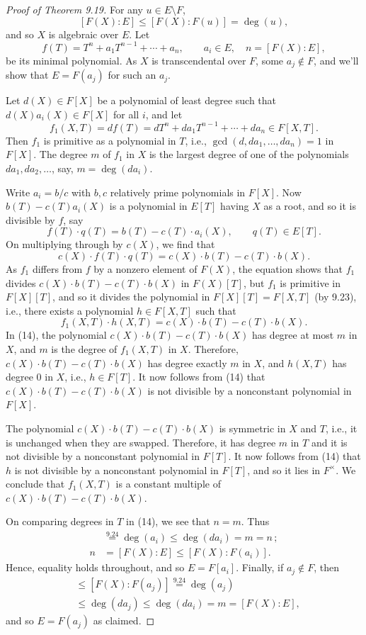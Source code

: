 \begin{proof}[Proof of Theorem 9.19]
For any $u\in E\setminus F$,
\[
[F(X):E]\leq[F(X):F(u)]=\deg(u),
\]
and so $X$ is algebraic over $E$. Let
\[
f(T)=T^n+a_1T^{n-1}+\cdots+a_n,\qquad a_i\in E,\quad n=[F(X):E],
\]
be its minimal polynomial. As $X$ is transcendental over $F$, some $a_j\notin F$, and we'll show that $E=F(a_j)$ for such an $a_j$.

Let $d(X)\in F[X]$ be a polynomial of least degree such that $d(X)a_i(X)\in F[X]$ for all $i$, and let
\[
f_1(X,T)=df(T)=dT^n+da_1T^{n-1}+\cdots+da_n\in F[X,T].
\]
Then $f_1$ is primitive as a polynomial in $T$, i.e., $\gcd(d,da_1,\ldots,da_n)=1$ in $F[X]$. The degree $m$ of $f_1$ in $X$ is the largest degree of one of the polynomials $da_1,da_2,\ldots$, say, $m=\deg(da_i)$.

Write $a_i=b/c$ with $b,c$ relatively prime polynomials in $F[X]$. Now $b(T)-c(T)a_i(X)$ is a polynomial in $E[T]$ having $X$ as a root, and so it is divisible by $f$, say
\[
f(T)\cdot q(T)=b(T)-c(T)\cdot a_i(X),\qquad q(T)\in E[T].
\]
On multiplying through by $c(X)$, we find that
\[
c(X)\cdot f(T)\cdot q(T)=c(X)\cdot b(T)-c(T)\cdot b(X).
\]
As $f_1$ differs from $f$ by a nonzero element of $F(X)$, the equation shows that $f_1$ divides $c(X)\cdot b(T)-c(T)\cdot b(X)$ in $F(X)[T]$, but $f_1$ is primitive in $F[X][T]$, and so it divides the polynomial in $F[X][T]=F[X,T]$ (by 9.23), i.e., there exists a polynomial $h\in F[X,T]$ such that
\[
f_1(X,T)\cdot h(X,T)=c(X)\cdot b(T)-c(T)\cdot b(X).\tag{14}
\]
In (14), the polynomial $c(X)\cdot b(T)-c(T)\cdot b(X)$ has degree at most $m$ in $X$, and $m$ is the degree of $f_1(X,T)$ in $X$. Therefore, $c(X)\cdot b(T)-c(T)\cdot b(X)$ has degree exactly $m$ in $X$, and $h(X,T)$ has degree $0$ in $X$, i.e., $h\in F[T]$. It now follows from (14) that $c(X)\cdot b(T)-c(T)\cdot b(X)$ is not divisible by a nonconstant polynomial in $F[X]$.

The polynomial $c(X)\cdot b(T)-c(T)\cdot b(X)$ is symmetric in $X$ and $T$, i.e., it is unchanged when they are swapped. Therefore, it has degree $m$ in $T$ and it is not divisible by a nonconstant polynomial in $F[T]$. It now follows from (14) that $h$ is not divisible by a nonconstant polynomial in $F[T]$, and so it lies in $F^\times$. We conclude that $f_1(X,T)$ is a constant multiple of $c(X)\cdot b(T)-c(T)\cdot b(X)$.

On comparing degrees in $T$ in (14), we see that $n=m$. Thus
\begin{align*}
[F(X):F(a_i)]&\overset{9.24}{=}\deg(a_i)\leq\deg(da_i)=m=n\,;\\
n&=[F(X):E]\leq[F(X):F(a_i)].
\end{align*}
Hence, equality holds throughout, and so $E=F[a_i]$.
Finally, if $a_j\notin F$, then
\begin{align*}
[F(X):E]&\leq[F(X):F(a_j)]\overset{9.24}{=}\deg(a_j)\\
&\leq\deg(da_j)\leq\deg(da_i)=m=[F(X):E],
\end{align*}
and so $E=F(a_j)$ as claimed.
\end{proof}
